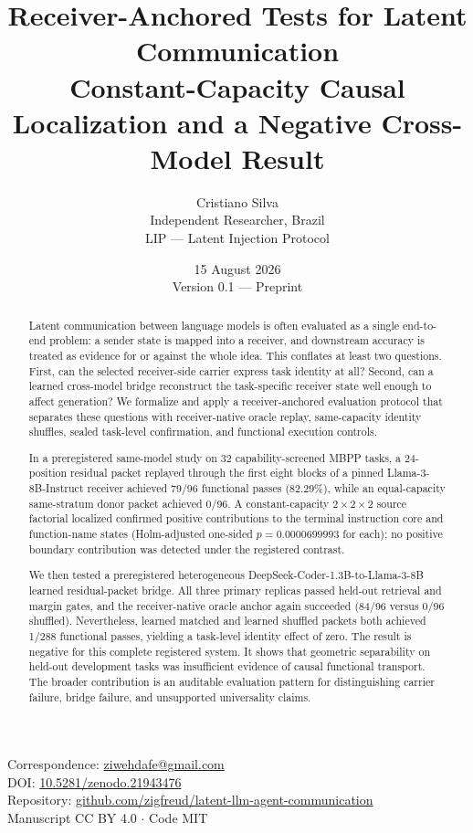 \documentclass[11pt]{article}
\title{\textbf{Receiver-Anchored Tests for Latent Communication}\\[0.35em]
\large Constant-Capacity Causal Localization and a Negative Cross-Model Result}
\author{Cristiano Silva\\
\normalsize Independent Researcher, Brazil\\
\small LIP --- Latent Injection Protocol}
\date{15 August 2026\\\small Version 0.1 --- Preprint}
\begin{document}
\maketitle

\begin{center}
\small
Correspondence: \href{mailto:ziwehdafe@gmail.com}{ziwehdafe@gmail.com}\\
DOI: \href{https://doi.org/10.5281/zenodo.21943476}{10.5281/zenodo.21943476}\\
Repository: \href{https://github.com/zigfreud/latent-llm-agent-communication}{github.com/zigfreud/latent-llm-agent-communication}\\
Manuscript CC BY 4.0 \(\cdot\) Code MIT
\end{center}

\begin{abstract}
Latent communication between language models is often evaluated as a single end-to-end problem: a sender state is mapped into a receiver, and downstream accuracy is treated as evidence for or against the whole idea. This conflates at least two questions. First, can the selected receiver-side carrier express task identity at all? Second, can a learned cross-model bridge reconstruct the task-specific receiver state well enough to affect generation? We formalize and apply a receiver-anchored evaluation protocol that separates these questions with receiver-native oracle replay, same-capacity identity shuffles, sealed task-level confirmation, and functional execution controls.

In a preregistered same-model study on 32 capability-screened MBPP tasks, a 24-position residual packet replayed through the first eight blocks of a pinned Llama-3-8B-Instruct receiver achieved 79/96 functional passes (82.29\%), while an equal-capacity same-stratum donor packet achieved 0/96. A constant-capacity \(2 \times 2 \times 2\) source factorial localized confirmed positive contributions to the terminal instruction core and function-name states (Holm-adjusted one-sided \(p = 0.0000699993\) for each); no positive boundary contribution was detected under the registered contrast.

We then tested a preregistered heterogeneous DeepSeek-Coder-1.3B-to-Llama-3-8B learned residual-packet bridge. All three primary replicas passed held-out retrieval and margin gates, and the receiver-native oracle anchor again succeeded (84/96 versus 0/96 shuffled). Nevertheless, learned matched and learned shuffled packets both achieved 1/288 functional passes, yielding a task-level identity effect of zero. The result is negative for this complete registered system. It shows that geometric separability on held-out development tasks was insufficient evidence of causal functional transport. The broader contribution is an auditable evaluation pattern for distinguishing carrier failure, bridge failure, and unsupported universality claims.
\end{abstract}
\end{document}
